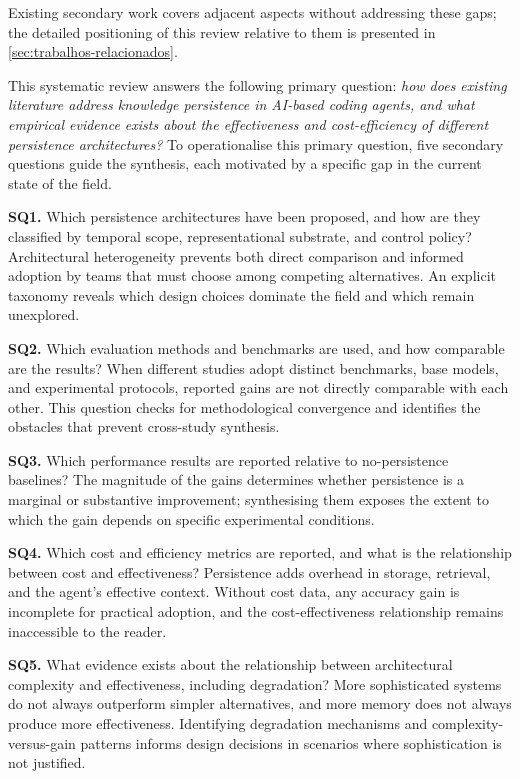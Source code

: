 Existing secondary work covers adjacent aspects without addressing
these gaps; the detailed positioning of this review relative to them is
presented in \autoref{sec:trabalhos-relacionados}.

This systematic review answers the following primary question:
\textit{how does existing literature address knowledge persistence in
AI-based coding agents, and what empirical evidence exists about the
effectiveness and cost-efficiency of different persistence
architectures?}
To operationalise this primary question, five secondary questions guide
the synthesis, each motivated by a specific gap in the current state of
the field.

\noindent\textbf{SQ1.} Which persistence architectures have been
proposed, and how are they classified by temporal scope,
representational substrate, and control policy?
Architectural heterogeneity prevents both direct comparison and
informed adoption by teams that must choose among competing
alternatives.
An explicit taxonomy reveals which design choices dominate the field
and which remain unexplored.

\noindent\textbf{SQ2.} Which evaluation methods and benchmarks are
used, and how comparable are the results?
When different studies adopt distinct benchmarks, base models, and
experimental protocols, reported gains are not directly comparable with
each other.
This question checks for methodological convergence and identifies the
obstacles that prevent cross-study synthesis.

\noindent\textbf{SQ3.} Which performance results are reported relative
to no-persistence baselines?
The magnitude of the gains determines whether persistence is a marginal
or substantive improvement; synthesising them exposes the extent to
which the gain depends on specific experimental conditions.

\noindent\textbf{SQ4.} Which cost and efficiency metrics are reported,
and what is the relationship between cost and effectiveness?
Persistence adds overhead in storage, retrieval, and the agent's
effective context.
Without cost data, any accuracy gain is incomplete for practical
adoption, and the cost-effectiveness relationship remains inaccessible
to the reader.

\noindent\textbf{SQ5.} What evidence exists about the relationship
between architectural complexity and effectiveness, including
degradation?
More sophisticated systems do not always outperform simpler
alternatives, and more memory does not always produce more
effectiveness.
Identifying degradation mechanisms and complexity-versus-gain patterns
informs design decisions in scenarios where sophistication is not
justified.

